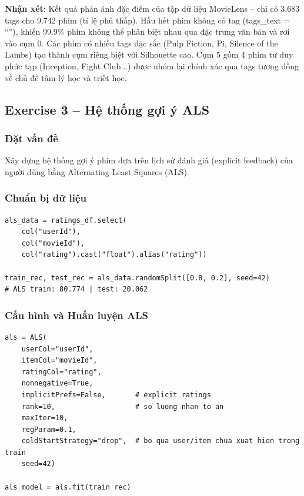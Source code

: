 \textbf{Nhận xét}: Kết quả phản ánh đặc điểm của tập dữ liệu MovieLens -- chỉ có 3.683 tags cho 9.742 phim (tỉ lệ phủ thấp). Hầu hết phim không có tag (tags\_text = ``''), khiến 99.9\% phim không thể phân biệt nhau qua đặc trưng văn bản và rơi vào cụm 0. Các phim có nhiều tags đặc sắc (Pulp Fiction, Pi, Silence of the Lambs) tạo thành cụm riêng biệt với Silhouette cao. Cụm 5 gồm 4 phim tư duy phức tạp (Inception, Fight Club...) được nhóm lại chính xác qua tags tương đồng về chủ đề tâm lý học và triết học.

\subsection{Exercise 3 -- Hệ thống gợi ý ALS}

\subsubsection{Đặt vấn đề}

Xây dựng hệ thống gợi ý phim dựa trên lịch sử đánh giá (explicit feedback) của người dùng bằng Alternating Least Squares (ALS).

\subsubsection{Chuẩn bị dữ liệu}

\begin{lstlisting}[style=PythonStyle, caption={Chuẩn bị dữ liệu và chia train/test}]
als_data = ratings_df.select(
    col("userId"),
    col("movieId"),
    col("rating").cast("float").alias("rating"))

train_rec, test_rec = als_data.randomSplit([0.8, 0.2], seed=42)
# ALS train: 80.774 | test: 20.062
\end{lstlisting}

\subsubsection{Cấu hình và Huấn luyện ALS}

\begin{lstlisting}[style=PythonStyle, caption={Cấu hình ALS model}]
als = ALS(
    userCol="userId",
    itemCol="movieId",
    ratingCol="rating",
    nonnegative=True,
    implicitPrefs=False,       # explicit ratings
    rank=10,                   # so luong nhan to an
    maxIter=10,
    regParam=0.1,
    coldStartStrategy="drop",  # bo qua user/item chua xuat hien trong train
    seed=42)

als_model = als.fit(train_rec)
\end{lstlisting}


